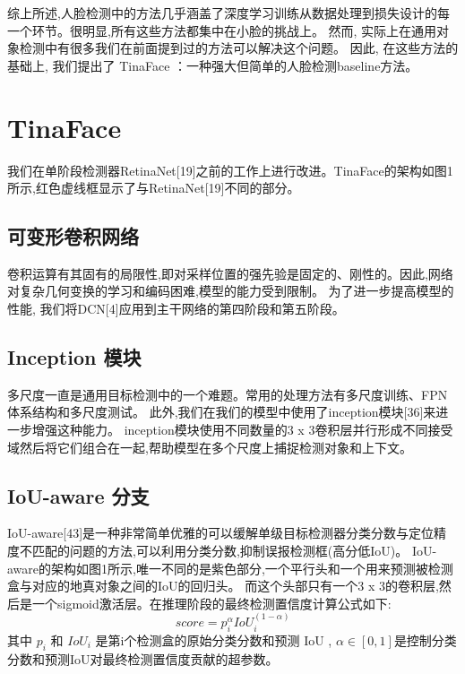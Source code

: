 \documentclass[twocolumn,10pt,a4paper]{article}%
\begin{document}
	综上所述,人脸检测中的方法几乎涵盖了深度学习训练从数据处理到损失设计的每一个环节。很明显,所有这些方法都集中在小脸的挑战上。
	然而, 实际上在通用对象检测中有很多我们在前面提到过的方法可以解决这个问题。
	因此, 在这些方法的基础上, 我们提出了 TinaFace ：一种强大但简单的人脸检测baseline方法。

	
	
	\section{TinaFace}
	
	我们在单阶段检测器RetinaNet[19]之前的工作上进行改进。TinaFace的架构如图1所示,红色虚线框显示了与RetinaNet[19]不同的部分。

	\subsection{可变形卷积网络}
	卷积运算有其固有的局限性,即对采样位置的强先验是固定的、刚性的。因此,网络对复杂几何变换的学习和编码困难,模型的能力受到限制。
	为了进一步提高模型的性能, 我们将DCN[4]应用到主干网络的第四阶段和第五阶段。
	
	\subsection{Inception 模块}
	多尺度一直是通用目标检测中的一个难题。常用的处理方法有多尺度训练、FPN体系结构和多尺度测试。
	此外,我们在我们的模型中使用了inception模块[36]来进一步增强这种能力。
	inception模块使用不同数量的3 x 3卷积层并行形成不同接受域然后将它们组合在一起,帮助模型在多个尺度上捕捉检测对象和上下文。
	
	\subsection{IoU-aware 分支}
	IoU-aware[43]是一种非常简单优雅的可以缓解单级目标检测器分类分数与定位精度不匹配的问题的方法,可以利用分类分数,抑制误报检测框(高分低IoU)。
	IoU-aware的架构如图1所示,唯一不同的是紫色部分,一个平行头和一个用来预测被检测盒与对应的地真对象之间的IoU的回归头。
	而这个头部只有一个3 x 3的卷积层,然后是一个sigmoid激活层。在推理阶段的最终检测置信度计算公式如下:
	\begin{equation}%
		score=p_{i}^{\alpha}IoU_{i}^{(1-\alpha)}
	\end{equation}
	其中 $p_i$ 和 $IoU_i$ 是第i个检测盒的原始分类分数和预测 IoU , $\alpha \in [0,1]$是控制分类分数和预测IoU对最终检测置信度贡献的超参数。
	
\end{document}
